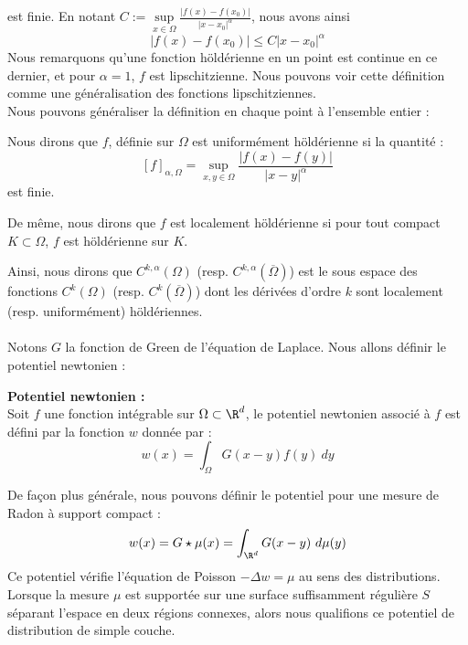 est finie.
En notant $C := \underset{x \in \Omega}{\sup} \frac{|f(x) - f(x_0)|}{|x-x_0|^{\alpha}}$, nous avons ainsi 
$$ |f(x) - f(x_0)| \leq C |x - x_0|^{\alpha}$$
Nous remarquons qu'une fonction höldérienne en un point est continue en ce dernier, et pour $\alpha = 1$, $f$ est lipschitzienne. Nous pouvons voir cette définition comme 
une généralisation des fonctions lipschitziennes.\\
Nous pouvons généraliser la définition en chaque point à l'ensemble entier : 
\begin{definitionbox}
\begin{definition}

    Nous dirons que $f$, définie sur $\Omega$ est uniformément höldérienne si la quantité :
    $$ [f]_{\alpha,\Omega} = \underset{x,y \in \Omega}{\sup} \frac{|f(x) - f(y)|}{|x-y|^{\alpha}} $$
    est finie.

    De même, nous dirons que $f$ est localement höldérienne si pour tout compact $K \subset \Omega$, $f$ est höldérienne sur $K$.
\end{definition}
\end{definitionbox}
Ainsi, nous dirons que $C^{k,\alpha}(\Omega)$ (resp. $C^{k,\alpha}(\overline{\Omega})$) est le sous espace des fonctions $C^k(\Omega)$ (resp. $C^k(\overline{\Omega})$) dont les dérivées d'ordre $k$ sont localement (resp. uniformément) höldériennes.\\
\\
Notons $G$ la fonction de Green de l'équation de Laplace. Nous allons définir le potentiel newtonien :
\begin{definitionbox}
    \begin{definition}\textbf{Potentiel newtonien :}\\
        Soit $f$ une fonction intégrable sur $\Omega \subset \R^d$, le potentiel newtonien associé à $f$ est défini par la fonction $w$ donnée par :
        $$ w(x) = \int_{\Omega} G(x - y)f(y) \ dy $$
    \end{definition}
\end{definitionbox}
\begin{remarkbox}
    \begin{remark}
        De façon plus générale, nous pouvons définir le potentiel pour une mesure de Radon à support compact :
        $$ w(x) = G \star \mu(x) = \int_{\R^d} G(x - y)\ d\mu(y) $$
        Ce potentiel vérifie l'équation de Poisson $-\Delta w = \mu$ au sens des distributions.\\
        Lorsque la mesure $\mu$ est supportée sur une surface suffisamment régulière $S$ séparant l'espace en deux régions connexes, alors nous qualifions ce potentiel de distribution de simple couche.
    \end{remark}
\end{remarkbox}
